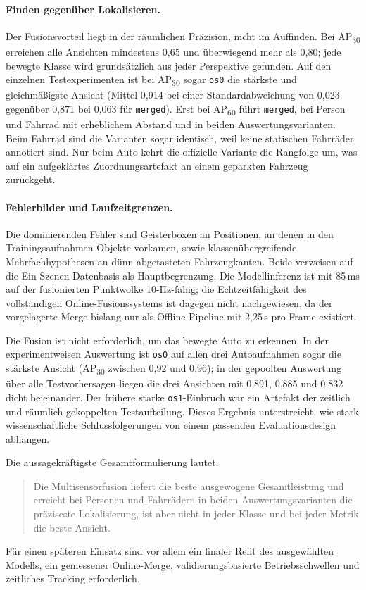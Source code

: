 \paragraph{Finden gegenüber Lokalisieren.} Der Fusionsvorteil liegt in der räumlichen Präzision, nicht im Auffinden. Bei AP\textsubscript{30} erreichen alle Ansichten mindestens 0{,}65 und überwiegend mehr als 0{,}80; jede bewegte Klasse wird grundsätzlich aus jeder Perspektive gefunden. Auf den einzelnen Testexperimenten ist bei AP\textsubscript{30} sogar \texttt{os0} die stärkste und gleichmäßigste Ansicht (Mittel 0{,}914 bei einer Standardabweichung von 0{,}023 gegenüber 0{,}871 bei 0{,}063 für \texttt{merged}). Erst bei AP\textsubscript{60} führt \texttt{merged}, bei Person und Fahrrad mit erheblichem Abstand und in beiden Auswertungsvarianten. Beim Fahrrad sind die Varianten sogar identisch, weil keine statischen Fahrräder annotiert sind. Nur beim Auto kehrt die offizielle Variante die Rangfolge um, was auf ein aufgeklärtes Zuordnungsartefakt an einem geparkten Fahrzeug zurückgeht.

\paragraph{Fehlerbilder und Laufzeitgrenzen.} Die dominierenden Fehler sind Geisterboxen an Positionen, an denen in den Trainingsaufnahmen Objekte vorkamen, sowie klassenübergreifende Mehrfachhypothesen an dünn abgetasteten Fahrzeugkanten. Beide verweisen auf die Ein-Szenen-Datenbasis als Hauptbegrenzung. Die Modellinferenz ist mit 85\,ms auf der fusionierten Punktwolke 10-Hz-fähig; die Echtzeitfähigkeit des vollständigen Online-Fusionssystems ist dagegen nicht nachgewiesen, da der vorgelagerte Merge bislang nur als Offline-Pipeline mit 2{,}25\,s pro Frame existiert.

\bigskip

Die Fusion ist nicht erforderlich, um das bewegte Auto zu erkennen. In der experimentweisen Auswertung ist \texttt{os0} auf allen drei Autoaufnahmen sogar die stärkste Ansicht (AP\textsubscript{30} zwischen 0{,}92 und 0{,}96); in der gepoolten Auswertung über alle Testvorhersagen liegen die drei Ansichten mit 0{,}891, 0{,}885 und 0{,}832 dicht beieinander. Der frühere starke \texttt{os1}-Einbruch war ein Artefakt der zeitlich und räumlich gekoppelten Testaufteilung. Dieses Ergebnis unterstreicht, wie stark wissenschaftliche Schlussfolgerungen von einem passenden Evaluationsdesign abhängen.

Die aussagekräftigste Gesamtformulierung lautet:

\begin{quote}
    Die Multisensorfusion liefert die beste ausgewogene Gesamtleistung und erreicht bei Personen und Fahrrädern in beiden Auswertungsvarianten die präziseste Lokalisierung, ist aber nicht in jeder Klasse und bei jeder Metrik die beste Ansicht.
\end{quote}

Für einen späteren Einsatz sind vor allem ein finaler Refit des ausgewählten Modells, ein gemessener Online-Merge, validierungsbasierte Betriebsschwellen und zeitliches Tracking erforderlich.
